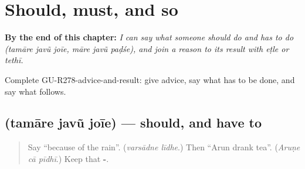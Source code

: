 
\chapter{Should, must, and so}
\label{ch:gu-should-must-and-so}

\begin{chapteropening}
\textbf{By the end of this chapter:} \emph{I can say what someone should do and has to do (tamāre javũ joīe, māre javũ paḍśe), and join a reason to its result with eṭle or tethī.}

Complete GU-R278-advice-and-result: give advice, say what has to be done, and say what follows.
\end{chapteropening}

\section[\texorpdfstring{\gu{તમારે} \gu{જવું} \gu{જોઈએ} (tamāre javũ joīe)}{તમારે જવું જોઈએ (tamāre javũ joīe)}]{   (tamāre javũ joīe) — should, and have to}

\label{lesson:GU-C278-javu-joie}



\begin{quote}
Say \textquotedblleft{}because of the rain\textquotedblright{}. (\emph{varsādne līdhe}.) Then \textquotedblleft{}Arun drank tea\textquotedblright{}. (\emph{Aruṇe cā pīdhī}.) Keep that \textbf{-}.
\end{quote}


